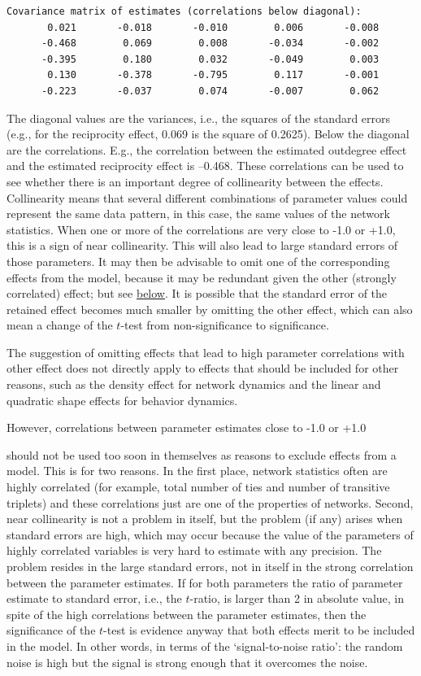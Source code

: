 \documentclass[a4paper,fleqn,11pt]{article}
\newcommand{\+}{\, + \,}
\begin{document}
{\footnotesize
 \begin{verbatim}
Covariance matrix of estimates (correlations below diagonal):
       0.021       -0.018       -0.010        0.006       -0.008
      -0.468        0.069        0.008       -0.034       -0.002
      -0.395        0.180        0.032       -0.049        0.003
       0.130       -0.378       -0.795        0.117       -0.001
      -0.223       -0.037        0.074       -0.007        0.062
 \end{verbatim}
}
The diagonal values are the variances, i.e., the squares of the
standard errors (e.g., for the reciprocity effect,
0.069 is the square of  0.2625). Below the
diagonal are the correlations. E.g., the correlation between the
estimated outdegree effect and the estimated reciprocity effect is
--0.468. These correlations can be used to see whether there is an
important degree of collinearity between the effects. Collinearity
means that several different combinations of parameter values
could represent the same data pattern, in
this case, the same values of the network statistics. When one or
more of the correlations are very close to -1.0 or +1.0, this is a
sign of near collinearity. This will also lead to large standard errors
of those parameters. It may then be advisable to omit one of the
corresponding effects from the model, because it may be redundant
given the other (strongly correlated) effect; but see
\hyperlink{T_collinearity}{below}. It is possible that
the standard error of the retained effect becomes much smaller by
omitting the other effect, which can also mean a change of the
$t$-test from non-significance to significance.

The suggestion of omitting effects that lead to high parameter
correlations with other effect does not directly apply to
effects that should be included for other reasons, such as
the density effect for network dynamics and the linear and
quadratic shape effects for behavior dynamics.

\hypertarget{T_collinearity}{However, correlations between
parameter estimates close to -1.0 or +1.0}
should not be used too soon in themselves as reasons to exclude effects
from a model. This is for two reasons.
In the first place, network statistics often are highly correlated
(for example, total number of ties and number of transitive triplets)
and these correlations just are one of the properties of networks.
Second, near collinearity is not a problem in itself,
but the problem (if any) arises when standard errors are high,
which may occur
because the value of the parameters of highly correlated variables
is very hard to estimate with any precision. The problem resides in the
large standard errors, not in itself in the strong correlation between
the parameter estimates. If for both parameters
the ratio of parameter estimate to standard error,
i.e., the $t$-ratio, is larger than 2 in absolute value,
in spite of the high correlations between the parameter estimates, then
the significance of the $t$-test is evidence anyway that both
effects merit to be included in the model.
In other words, in terms of the `signal-to-noise ratio':
the random noise is high but the signal is strong enough
that it overcomes the noise.
\end{document}
